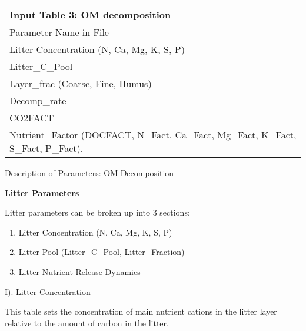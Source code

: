 \documentclass[
]{article}
\providecommand{\tightlist}{%
  \setlength{\itemsep}{0pt}\setlength{\parskip}{0pt}}
\begin{document}
\begin{longtable}[]{@{}l@{}}
\toprule
\begin{minipage}[b]{0.97\columnwidth}\raggedright
Input Table 3: OM decomposition\strut
\end{minipage}\tabularnewline
\midrule
\endhead
\begin{minipage}[t]{0.97\columnwidth}\raggedright
Parameter Name in File\strut
\end{minipage}\tabularnewline
\begin{minipage}[t]{0.97\columnwidth}\raggedright
Litter Concentration (N, Ca, Mg, K, S, P)\strut
\end{minipage}\tabularnewline
\begin{minipage}[t]{0.97\columnwidth}\raggedright
Litter\_C\_Pool\strut
\end{minipage}\tabularnewline
\begin{minipage}[t]{0.97\columnwidth}\raggedright
Layer\_frac (Coarse, Fine, Humus)\strut
\end{minipage}\tabularnewline
\begin{minipage}[t]{0.97\columnwidth}\raggedright
Decomp\_rate\strut
\end{minipage}\tabularnewline
\begin{minipage}[t]{0.97\columnwidth}\raggedright
CO2FACT\strut
\end{minipage}\tabularnewline
\begin{minipage}[t]{0.97\columnwidth}\raggedright
Nutrient\_Factor (DOCFACT, N\_Fact, Ca\_Fact, Mg\_Fact, K\_Fact,
S\_Fact, P\_Fact).\strut
\end{minipage}\tabularnewline
\bottomrule
\end{longtable}

Description of Parameters: OM Decomposition

\textbf{Litter Parameters}

Litter parameters can be broken up into 3 sections:

\begin{enumerate}
\def\labelenumi{\arabic{enumi}.}
\tightlist
\item
  Litter Concentration (N, Ca, Mg, K, S, P)
\item
  Litter Pool (Litter\_C\_Pool, Litter\_Fraction)
\item
  Litter Nutrient Release Dynamics
\end{enumerate}

I). Litter Concentration

This table sets the concentration of main nutrient cations in the litter
layer relative to the amount of carbon in the litter.
\end{document}
